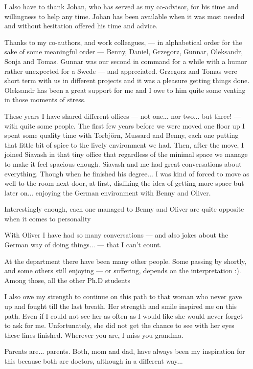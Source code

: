 I also have to thank Johan, who has served as my co-advisor, for his time and willingness 
to help any time. Johan has been available when it was most needed and without hesitation 
offered his time and advice. 

Thanks to my co-authors, and work colleagues, --- in alphabetical order for the 
sake of some meaningful order --- Benny, Daniel, Grzegorz, Gunnar, Oleksandr, Sonja 
and Tomas. Gunnar was our second in command for a while with a humor rather unexpected 
for a Swede --- and appreciated. Grzegorz and Tomas were short term with us in different 
projects and it was a pleasure getting things done. Oleksandr has been a great support 
for me and I owe to him quite some venting in those moments of stress. 


These years I have shared different offices --- not one... nor two... but three! 
--- with quite some people. The first few years before we were moved one floor up 
I spent some quality time with Torbjörn, Mussard and Benny, each one putting that 
little bit of spice to the lively environment we had. Then, after the move, I joined 
Siavash in that tiny office that regardless of the minimal space we manage to make 
it feel spacious enough. Siavash and me had great conversations about everything.
Though when he finished his degree... I was kind of forced to move as well to the 
room next door, at first, disliking the idea of getting more space but later on... 
enjoying the German environment with Benny and Oliver.

Interestingly enough, each one managed to Benny and Oliver are quite opposite when it comes to personality 

With Oliver I have had 
so many conversations --- and also jokes about the German way of doing things... --- 
that I can't count.

At the department there have been many other people. Some passing by shortly, and 
some others still enjoying --- or suffering, depends on the interpretation :). Among 
those, all the other Ph.D students 

I also owe my strength to continue on this path to that woman who never gave up 
and fought till the last breath. Her strength and smile inspired me on this path.
Even if I could not see her as often as I would like she would never forget to ask 
for me. Unfortunately, she did not get the chance to see with her eyes these lines 
finished. Wherever you are, I miss you grandma.

Parents are... parents. Both, mom and dad, have always been my inspiration for this 
because both are doctors, although in a different way... 

